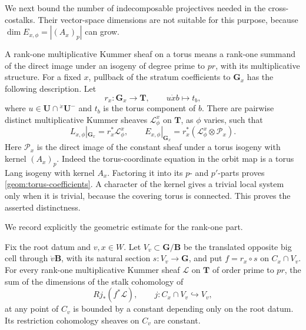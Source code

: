 We next bound the number of indecomposable projectives needed in the
cross-costalks. Their vector-space dimensions are not suitable for
this purpose, because \(\dim E_{x,\phi}=|(A_x)_p|\) can grow.

A rank-one multiplicative Kummer sheaf on a torus means a rank-one
summand of the direct image under an isogeny of degree prime to \(pr\),
with its multiplicative structure. For a fixed \(x\), pullback of the
stratum coefficients to \(\mathbf G_x\) has the following description.
Let
\[
 r_x:\mathbf G_x\longrightarrow\mathbf T,
 \qquad u\dot x b\longmapsto t_b,
\]
where \(u\in\mathbf U\cap{}^{\dot x}\mathbf U^-\) and \(t_b\) is the
torus component of \(b\). There are pairwise distinct multiplicative
Kummer sheaves \(\mathcal L^x_\phi\) on \(\mathbf T\), as \(\phi\)
varies, such that
\begin{equation}\label{geom:torus-coefficients}
 L_{x,\phi}|_{\mathbf G_x}=r_x^*\mathcal L^x_\phi,
 \qquad
 E_{x,\phi}|_{\mathbf G_x}
 =r_x^*(\mathcal L^x_\phi\otimes\mathcal P_x).
\end{equation}
Here \(\mathcal P_x\) is the direct image of the constant sheaf under
a torus isogeny with kernel \((A_x)_p\).
Indeed the torus-coordinate equation in the orbit map is a torus Lang
isogeny with kernel \(A_x\). Factoring it into its \(p\)- and
\(p'\)-parts proves \eqref{geom:torus-coefficients}. A character of the
kernel gives a trivial local system only when it is trivial, because
the covering torus is connected. This proves the asserted distinctness.

We record explicitly the geometric estimate for the rank-one part.

\begin{lemma}\label{geom:kummer-stalk}
Fix the root datum and \(v,x\in W\). Let \(V_v\subset\mathbf G/\mathbf B\)
be the translated opposite big cell through \(\dot v\mathbf B\), with
its natural section \(s:V_v\to\mathbf G\), and put
\(f=r_x\circ s\) on \(C_x\cap V_v\). For every rank-one multiplicative
Kummer sheaf \(\mathcal L\) on \(\mathbf T\) of order prime to \(pr\),
the sum of the dimensions of the stalk cohomology of
\[
 Rj_*(f^*\mathcal L),
 \qquad j:C_x\cap V_v\hookrightarrow V_v,
\]
at any point of \(C_v\) is bounded by a constant depending only on the
root datum. Its restriction cohomology sheaves on \(C_v\) are constant.
\end{lemma}

